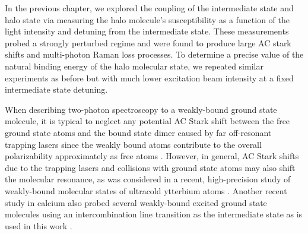 
In the previous chapter, we explored the coupling of the intermediate state and halo state via measuring the halo molecule's susceptibility as a function of the light intensity and detuning from the intermediate state.
These measurements probed a strongly perturbed regime and were found to produce large AC stark shifts and multi-photon Raman loss processes. 
To determine a precise value of the natural binding energy of the halo molecular state, we repeated similar experiments as before but with much lower excitation beam intensity at a fixed intermediate state detuning.

When describing two-photon spectroscopy to a weakly-bound ground state molecule, it is typical to neglect any potential AC Stark shift between the free ground state atoms and the bound state dimer caused by far off-resonant trapping lasers since the weakly bound atoms contribute to the overall polarizability approximately as free atoms \cite{Jones2006}.
However, in general, AC Stark shifts due to the trapping lasers and collisions with ground state atoms may also shift the molecular resonance, as was considered in a recent, high-precision study of weakly-bound molecular states of ultracold ytterbium atoms \cite{bbc17}.
Another recent study in calcium also probed several weakly-bound excited ground state molecules using an intercombination line transition as the intermediate state as is used in this work \cite{Pachomow2017a}.

